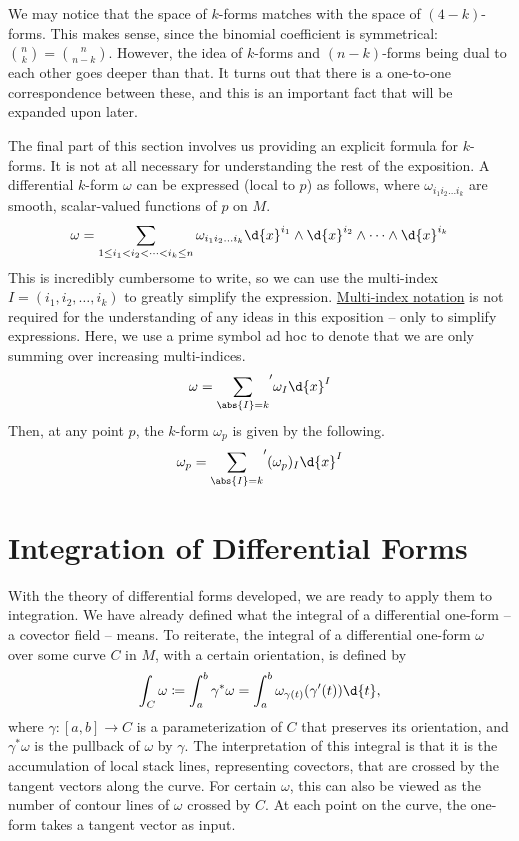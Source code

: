 \documentclass[a4paper,12pt]{article}
\begin{document}
We may notice that the space of $k$-forms matches with the space of $(4-k)$-forms.
This makes sense, since the binomial coefficient is symmetrical: $\binom{n}{k} = \binom{n}{n - k}$.
However, the idea of $k$-forms and $(n-k)$-forms being dual to each other goes deeper than that.
It turns out that there is a one-to-one correspondence between these, and this is an important fact that will be expanded upon later.

The final part of this section involves us providing an explicit formula for $k$-forms.
It is not at all necessary for understanding the rest of the exposition.
A differential $k$-form $\omega$ can be expressed (local to $p$) as follows, where $\omega_{i_1 i_2 \ldots i_k}$ are smooth, scalar-valued functions of $p$ on $M$.
\begin{equation*}
    \omega = \sum_{1 \leq i_1 < i_2 < \cdots < i_k \leq n} \omega_{i_1 i_2 \ldots i_k} \d{x}^{i_1} \wedge \d{x}^{i_2} \wedge \cdots \wedge \d{x}^{i_k}
\end{equation*}
This is incredibly cumbersome to write, so we can use the multi-index $I = (i_1, i_2, \ldots, i_k)$ to greatly simplify the expression.
\href{https://en.wikipedia.org/wiki/Multi-index_notation}{Multi-index notation} is not required for the understanding of any ideas in this exposition -- only to simplify expressions.
Here, we use a prime symbol ad hoc to denote that we are only summing over increasing multi-indices.
\begin{equation*}
    \omega = {\sum_{\abs{I} = k}}' \omega_I \d{x}^I
\end{equation*}
Then, at any point $p$, the $k$-form $\omega_p$ is given by the following.
\begin{equation*}
    \omega_p = {\sum_{\abs{I} = k}}' (\omega_p)_I \d{x}^I
\end{equation*}

\section{Integration of Differential Forms}

With the theory of differential forms developed, we are ready to apply them to integration.
We have already defined what the integral of a differential one-form -- a covector field -- means.
To reiterate, the integral of a differential one-form $\omega$ over some curve $C$ in $M$, with a certain orientation, is defined by
\begin{equation*}
    \int_C \omega \coloneq \int_a^b \gamma^* \omega = \int_a^b \omega_{\gamma(t)} (\gamma'(t)) \d{t},
\end{equation*}
where $\gamma \colon [a,b] \to C$ is a parameterization of $C$ that preserves its orientation, and $\gamma^* \omega$ is the pullback of $\omega$ by $\gamma$.
The interpretation of this integral is that it is the accumulation of local stack lines, representing covectors, that are crossed by the tangent vectors along the curve.
For certain $\omega$, this can also be viewed as the number of contour lines of $\omega$ crossed by $C$.
At each point on the curve, the one-form takes a tangent vector as input.
\end{document}
